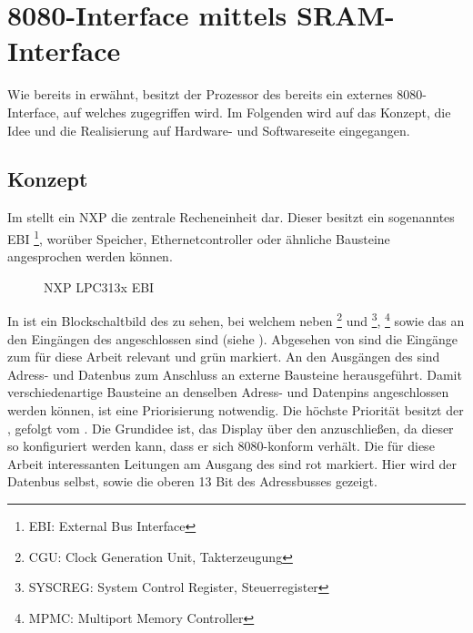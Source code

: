 \section{8080-Interface mittels SRAM-Interface}
\label{sec:TeilA_8080SRAM}
Wie bereits in  erwähnt, besitzt der Prozessor des  bereits ein externes 8080-Interface, auf welches zugegriffen wird. Im Folgenden wird auf das Konzept, die Idee und die Realisierung auf Hardware- und Softwareseite eingegangen.
\newpage
\subsection{Konzept}
\label{cha:teila_konzept}
Im  stellt ein NXP  die zentrale Recheneinheit dar. Dieser besitzt ein sogenanntes EBI \footnote{EBI: External Bus Interface}, worüber Speicher, Ethernetcontroller oder ähnliche Bausteine angesprochen werden können.

\begin{figure}[htp]
	\centering
{}
	\caption{NXP LPC313x EBI}
	\label{fig:lpc_ebi}
\end{figure}

In  ist ein Blockschaltbild des  zu sehen, bei welchem neben \footnote{CGU: Clock Generation Unit, Takterzeugung} und \footnote{SYSCREG: System Control Register, Steuerregister}, \footnote{MPMC: Multiport Memory Controller} sowie das  an den Eingängen des  angeschlossen sind (siehe \cite{NXP2010}). Abgesehen von  sind die Eingänge zum  für diese Arbeit relevant und grün markiert. An den Ausgängen des  sind Adress- und Datenbus zum Anschluss an externe Bausteine herausgeführt. Damit verschiedenartige Bausteine an denselben Adress- und Datenpins angeschlossen werden können, ist eine Priorisierung notwendig. Die höchste Priorität besitzt der , gefolgt vom . 
Die Grundidee ist, das Display über den  anzuschließen, da dieser so konfiguriert werden kann, dass er sich 8080-konform verhält. Die für diese Arbeit interessanten Leitungen am Ausgang des  sind rot markiert. Hier wird der Datenbus selbst, sowie die oberen 13 Bit des Adressbusses gezeigt.


